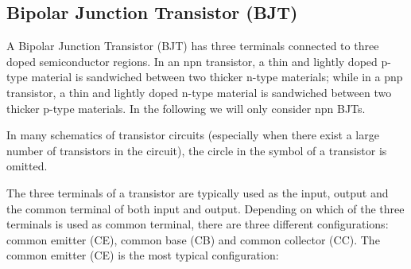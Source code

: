 \subsection*{Bipolar Junction Transistor (BJT)}

A Bipolar Junction Transistor (BJT) has three terminals connected to three
doped semiconductor regions. In an npn transistor, a thin and lightly doped 
p-type material is sandwiched between two thicker n-type materials; while 
in a pnp transistor, a thin and lightly doped n-type material is sandwiched 
between two thicker p-type materials. In the following we will only consider
npn BJTs.



In many schematics of transistor circuits (especially when there exist a
large number of transistors in the circuit), the circle in the symbol of
a transistor is omitted.



The three terminals of a transistor are typically used as the input, output 
and the common terminal of both input and output. Depending on which of the
three terminals is used as common terminal, there are three different 
configurations: common emitter (CE), common base (CB) and common collector 
(CC). The common emitter (CE) is the most typical configuration:


